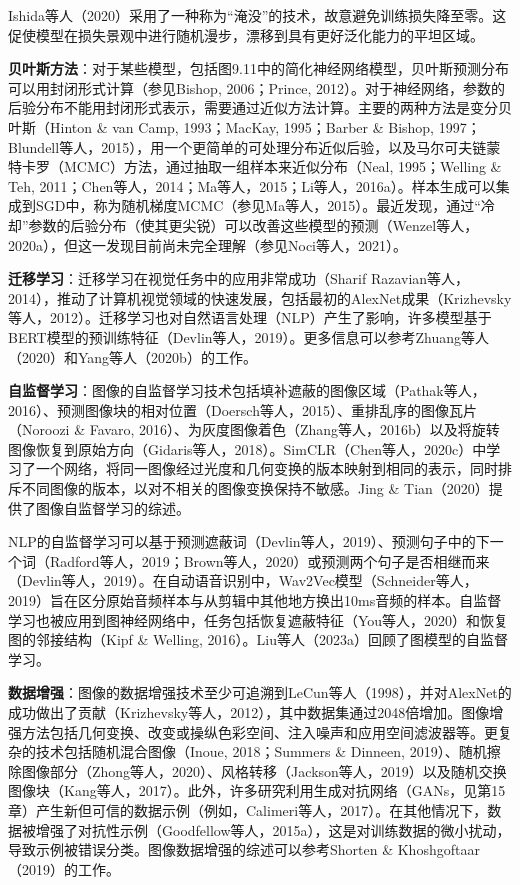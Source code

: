 Ishida等人（2020）采用了一种称为“淹没”的技术，故意避免训练损失降至零。这促使模型在损失景观中进行随机漫步，漂移到具有更好泛化能力的平坦区域。

\textbf{贝叶斯方法}：对于某些模型，包括图9.11中的简化神经网络模型，贝叶斯预测分布可以用封闭形式计算（参见Bishop, 2006；Prince, 2012）。对于神经网络，参数的后验分布不能用封闭形式表示，需要通过近似方法计算。主要的两种方法是变分贝叶斯（Hinton \& van Camp, 1993；MacKay, 1995；Barber \& Bishop, 1997；Blundell等人，2015），用一个更简单的可处理分布近似后验，以及马尔可夫链蒙特卡罗（MCMC）方法，通过抽取一组样本来近似分布（Neal, 1995；Welling \& Teh, 2011；Chen等人，2014；Ma等人，2015；Li等人，2016a）。样本生成可以集成到SGD中，称为随机梯度MCMC（参见Ma等人，2015）。最近发现，通过“冷却”参数的后验分布（使其更尖锐）可以改善这些模型的预测（Wenzel等人，2020a），但这一发现目前尚未完全理解（参见Noci等人，2021）。

\textbf{迁移学习}：迁移学习在视觉任务中的应用非常成功（Sharif Razavian等人，2014），推动了计算机视觉领域的快速发展，包括最初的AlexNet成果（Krizhevsky等人，2012）。迁移学习也对自然语言处理（NLP）产生了影响，许多模型基于BERT模型的预训练特征（Devlin等人，2019）。更多信息可以参考Zhuang等人（2020）和Yang等人（2020b）的工作。

\textbf{自监督学习}：图像的自监督学习技术包括填补遮蔽的图像区域（Pathak等人，2016）、预测图像块的相对位置（Doersch等人，2015）、重排乱序的图像瓦片（Noroozi \& Favaro, 2016）、为灰度图像着色（Zhang等人，2016b）以及将旋转图像恢复到原始方向（Gidaris等人，2018）。SimCLR（Chen等人，2020c）中学习了一个网络，将同一图像经过光度和几何变换的版本映射到相同的表示，同时排斥不同图像的版本，以对不相关的图像变换保持不敏感。Jing \& Tian（2020）提供了图像自监督学习的综述。

NLP的自监督学习可以基于预测遮蔽词（Devlin等人，2019）、预测句子中的下一个词（Radford等人，2019；Brown等人，2020）或预测两个句子是否相继而来（Devlin等人，2019）。在自动语音识别中，Wav2Vec模型（Schneider等人，2019）旨在区分原始音频样本与从剪辑中其他地方换出10ms音频的样本。自监督学习也被应用到图神经网络中，任务包括恢复遮蔽特征（You等人，2020）和恢复图的邻接结构（Kipf \& Welling, 2016）。Liu等人（2023a）回顾了图模型的自监督学习。

\textbf{数据增强}：图像的数据增强技术至少可追溯到LeCun等人（1998），并对AlexNet的成功做出了贡献（Krizhevsky等人，2012），其中数据集通过2048倍增加。图像增强方法包括几何变换、改变或操纵色彩空间、注入噪声和应用空间滤波器等。更复杂的技术包括随机混合图像（Inoue, 2018；Summers \& Dinneen, 2019）、随机擦除图像部分（Zhong等人，2020）、风格转移（Jackson等人，2019）以及随机交换图像块（Kang等人，2017）。此外，许多研究利用生成对抗网络（GANs，见第15章）产生新但可信的数据示例（例如，Calimeri等人，2017）。在其他情况下，数据被增强了对抗性示例（Goodfellow等人，2015a），这是对训练数据的微小扰动，导致示例被错误分类。图像数据增强的综述可以参考Shorten \& Khoshgoftaar（2019）的工作。

